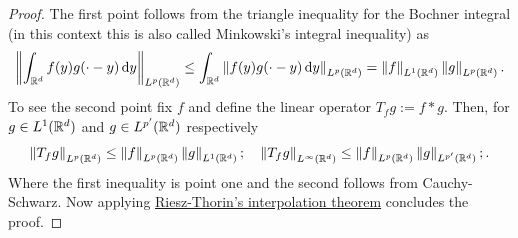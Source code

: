 \documentclass[
    a4paper,
    DIV=14,
    abstract=true,
    numbers=noenddot
]{scrartcl}
\begin{document}
\begin{proof}
	The first point follows from the triangle inequality for the Bochner integral (in this context this is also called Minkowski's integral inequality) as
	\begin{align*}
		\left\lVert \int_{\mathbb{R}^d}f(y)g(\cdot -y) \,\mathrm{d} y \right\rVert_{L^p(\mathbb{R}^d)}\leq\int_{\mathbb{R}^d}\left\lVert f(y)g(\cdot -y) \,\mathrm{d} y \right\rVert_{L^p(\mathbb{R}^d)}= \left\lVert f \right\rVert_{L^1(\mathbb{R}^d)} \left\lVert g \right\rVert_{L^p(\mathbb{R}^d)}.
	\end{align*}
	To see the second point fix $f$ and define the linear operator $T_fg:= f*g$. Then, for $g \in  L^1(\mathbb{R}^d)$ and $g \in  L^{p'}(\mathbb{R}^d)$ respectively
	\begin{align*}
		\left\lVert T_f g \right\rVert_{L^p(\mathbb{R}^d)} \leq \left\lVert f \right\rVert_{L^p(\mathbb{R}^d)} \left\lVert g \right\rVert_{L^1(\mathbb{R}^d)}; \quad    \left\lVert T_f g \right\rVert_{L^\infty(\mathbb{R}^d)} \leq \left\lVert f \right\rVert_{L^p(\mathbb{R}^d)} \left\lVert g \right\rVert_{L^{p'}(\mathbb{R}^d)};  .
	\end{align*}
	Where the first inequality is point one and the second follows from Cauchy-Schwarz. Now applying \href{ https://en.wikipedia.org/wiki/Riesz%E2%80%93Thorin_theorem#:~:text=the%20sumset%20formulation.-,Riesz%E2%80%93Thorin,-interpolation%20theorem%C2%A0%E2%80%94%C2%A0}{Riesz-Thorin's interpolation theorem} concludes the proof.
\end{proof}
\end{document}
